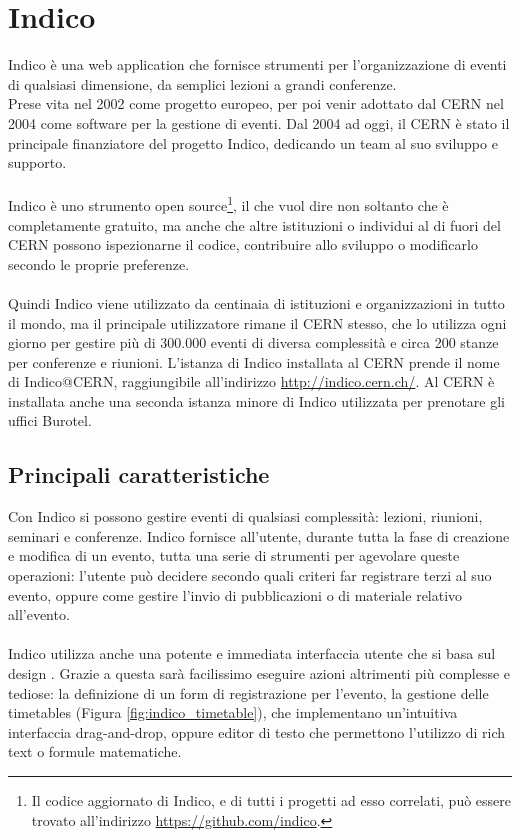 \chapter{Indico} \label{chap:indico}
	
	Indico è una web application che fornisce strumenti per l'organizzazione di eventi di qualsiasi dimensione, da semplici lezioni a grandi conferenze.\\
	Prese vita nel 2002 come progetto europeo, per poi venir adottato dal \ac{CERN} nel 2004 come software per la gestione di eventi. Dal 2004 ad oggi, il \ac{CERN} è stato il principale finanziatore del progetto Indico, dedicando un team al suo sviluppo e supporto.\\
	\\
	Indico è uno strumento open source\footnote{Il codice aggiornato di Indico, e di tutti i progetti ad esso correlati, può essere trovato all'indirizzo \url{https://github.com/indico}.}, il che vuol dire non soltanto che è completamente gratuito, ma anche che altre istituzioni o individui al di fuori del \ac{CERN} possono ispezionarne il codice, contribuire allo sviluppo o modificarlo secondo le proprie preferenze.\\
	\\
	Quindi Indico viene utilizzato da centinaia di istituzioni e organizzazioni in tutto il mondo, ma il principale utilizzatore rimane il \ac{CERN} stesso, che lo utilizza ogni giorno per gestire più di 300.000 eventi di diversa complessità e circa 200 stanze per conferenze e riunioni. L'istanza di Indico installata al \ac{CERN} prende il nome di Indico@CERN, raggiungibile all'indirizzo \url{http://indico.cern.ch/}. Al \ac{CERN} è installata anche una seconda istanza minore di Indico utilizzata per prenotare gli uffici Burotel.
	
	\section{Principali caratteristiche} \label{sec:indico;caratteristiche}
	
		Con Indico si possono gestire eventi di qualsiasi complessità: lezioni, riunioni, seminari e conferenze. Indico fornisce all'utente, durante tutta la fase di creazione e modifica di un evento, tutta una serie di strumenti per agevolare queste operazioni: l'utente può decidere secondo quali criteri far registrare terzi al suo evento, oppure come gestire l'invio di pubblicazioni o di materiale relativo all'evento.\\
		\\
		Indico utilizza anche una potente e immediata interfaccia utente che si basa sul design . Grazie a questa  sarà facilissimo eseguire azioni altrimenti più complesse e tediose: la definizione di un form di registrazione per l'evento, la gestione delle timetables (Figura \ref{fig:indico_timetable}), che implementano un'intuitiva interfaccia drag-and-drop, oppure editor di testo che permettono l'utilizzo di rich text o formule matematiche.\\

